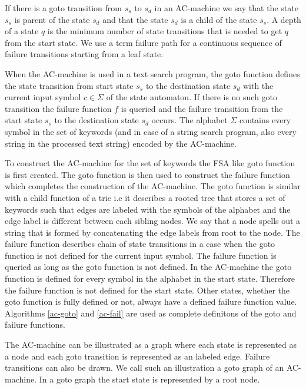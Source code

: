 \documentclass[english,twoside,censored,csm,algorithms-track-2020]{HYthesisML}
\theoremstyle{plain}
\theoremstyle{definition}
\begin{document}
If there is a goto transition from $s_s$ to $s_d$ in an AC-machine we say that the state $s_s$ is parent
of the state $s_d$ and that the state $s_d$ is a child of the state $s_s$. A depth of a state $q$ is the
minimum number of state transitions that is needed to get $q$ from the start state. 
We use a term failure path for a continuous sequence of failure transitions starting from a leaf state.

When the AC-machine is used in a text search program,
the goto function defines the state transition from start state $s_s$ to the destination state
$s_d$ with the current input symbol $c\in \Sigma$ of the state automaton. If there is no such
goto transition
the failure function $f$ is queried and the failure transition from the start state $s_s$ to
the destination state $s_d$ occurs. The alphabet $\Sigma$ contains every symbol in the set of
keywords (and in case of a string search program, also every string in the processed text string)
encoded by the AC-machine.

To construct the AC-machine for the set of keywords the \textsc{FSA} like goto function is first
created. The goto function is then used to construct the failure function which completes the
construction of the AC-machine. The goto function is similar with a child function of a trie
i.e it describes a rooted tree that stores a set of keywords such that edges are labeled with the
symbols of the alphabet and the edge label is different between each sibling nodes. We say that a node
spells out a string that is formed by concatenating the edge labels from root to the node.
The failure function describes chain of state transitions in a case when the goto function is not defined
for the current input symbol. The failure function is queried as long as the goto function is not defined.
In the AC-machine the goto function is defined for every symbol in the alphabet in the start state.
Therefore the failure function is not defined for the start state. Other states, whether the
goto function is fully defined or not, always have a defined failure function value.
Algorithms \ref{ac-goto} and \ref{ac-fail} are used as complete definitons of the goto and
failure functions. 

The AC-machine can be illustrated as a graph where each state is represented as a node and each
goto transition is represented as an labeled edge. Failure transitions can also be drawn. We call
such an illustration a goto graph of an AC-machine. In a goto graph the start state is represented by
a root node.
\end{document}
